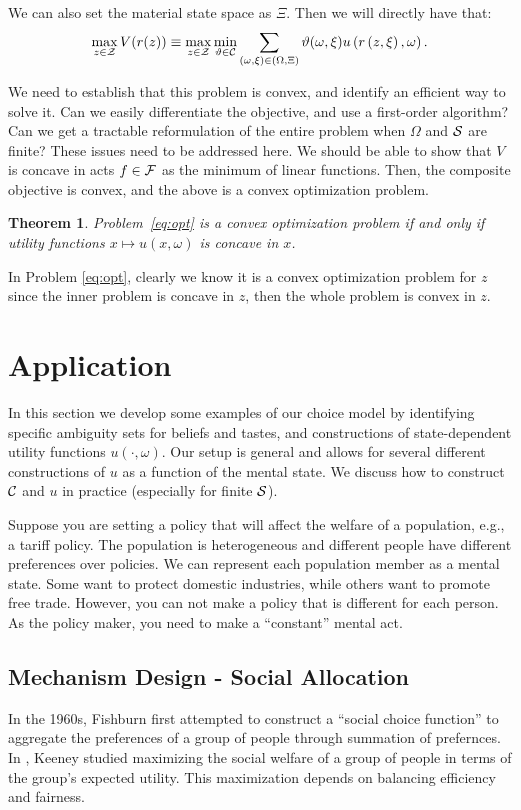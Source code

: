 \documentclass[11pt,oneside]{article}
\theoremstyle{plain}
\theoremstyle{plain}
\theoremstyle{plain}
\newtheorem{thm}{Theorem}[section]
\theoremstyle{plain}
\theoremstyle{plain}
\theoremstyle{definition}
\theoremstyle{definition}
\theoremstyle{remark}
\theoremstyle{plain}
\newcommand{\F}{{\cal F}}
\newcommand{\mcs}{{\cal S}}
\newcommand{\wh}[1]{{\color{blue} #1     }}
\newcommand{\bb}[1]{{\color{red} #1     }}
\begin{document}
\bb{
We can also set the material state space as $\Xi$. Then we will directly have that:
$$
\max_{z \in {\cal Z}} V(r(z)) \equiv \max_{z \in {\cal Z}} \min_{\vartheta \in {\cal C}} \sum_{(\omega,\xi) \in (\Omega, \Xi)} \vartheta(\omega,\xi) u\left(r\left(z, \xi\right), \omega\right).
$$

}

\wh{We need to establish that this problem is convex, and identify an efficient way to solve it. Can we easily differentiate the objective, and use a first-order algorithm? Can we get a tractable reformulation of the entire problem when $\Omega$ and $\mcs$ are finite? These issues need to be addressed here.
We should be able to show that $V$ is concave in acts $f \in \F$ as the minimum of linear functions. Then, the composite objective is convex, and the above is a convex optimization problem.
}

\begin{thm}
\label{thm:optimization}
Problem~\eqref{eq:opt} is a convex optimization problem if and only if utility functions $x \mapsto u(x,\omega)$ is concave in $x$.
\end{thm}

In Problem \ref{eq:opt}, clearly we know it is a convex optimization problem for $z$ since the inner problem is concave in $z$, then the whole problem is
convex in $z$. 


\section{Application}
\label{sec:application}
In this section we develop some examples of our choice model by identifying specific ambiguity sets for beliefs and tastes, and constructions of state-dependent utility functions $u(\cdot, \omega)$.
Our setup is general and allows for several different constructions of $u$ as a function of the mental state.
We discuss how to construct ${\cal C}$ and $u$ in practice (especially for finite $\mcs$).

Suppose you are setting a policy that will affect the welfare of a population, e.g., a tariff policy. The population is heterogeneous and different people have different preferences over policies. We can represent each population member as a mental state. Some want to protect domestic industries, while others want to promote free trade.
    However, you can not make a policy that is different for each person. As the policy maker, you need to make a ``constant'' mental act.

\subsection{Mechanism Design - Social Allocation}
In the 1960s, Fishburn \cite{fishburn1969preferences} first attempted to construct a ``social choice function'' to aggregate the preferences of a group of people through summation of prefernces.
In \cite{keeney1975group}, Keeney studied maximizing the social welfare of a group of people in terms of the group's expected utility.
This maximization depends on balancing efficiency and fairness.
\end{document}
